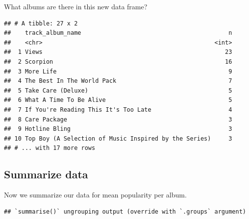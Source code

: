\documentclass[
]{book}
\newenvironment{Shaded}{\begin{snugshade}}{\end{snugshade}}
\newcommand{\DataTypeTok}[1]{\textcolor[rgb]{0.13,0.29,0.53}{#1}}
\newcommand{\KeywordTok}[1]{\textcolor[rgb]{0.13,0.29,0.53}{\textbf{#1}}}
\newcommand{\NormalTok}[1]{#1}
\newcommand{\OperatorTok}[1]{\textcolor[rgb]{0.81,0.36,0.00}{\textbf{#1}}}
\newcommand{\StringTok}[1]{\textcolor[rgb]{0.31,0.60,0.02}{#1}}
\begin{document}
What albums are there in this new data frame?

\begin{Shaded}
\end{Shaded}

\begin{verbatim}
## # A tibble: 27 x 2
##    track_album_name                                          n
##    <chr>                                                 <int>
##  1 Views                                                    23
##  2 Scorpion                                                 16
##  3 More Life                                                 9
##  4 The Best In The World Pack                                7
##  5 Take Care (Deluxe)                                        5
##  6 What A Time To Be Alive                                   5
##  7 If You're Reading This It's Too Late                      4
##  8 Care Package                                              3
##  9 Hotline Bling                                             3
## 10 Top Boy (A Selection of Music Inspired by the Series)     3
## # ... with 17 more rows
\end{verbatim}

\hypertarget{summarize-data}{%
\subsection{Summarize data}\label{summarize-data}}

Now we summarize our data for mean popularity per album.

\begin{Shaded}
\end{Shaded}

\begin{verbatim}
## `summarise()` ungrouping output (override with `.groups` argument)
\end{verbatim}
\end{document}
